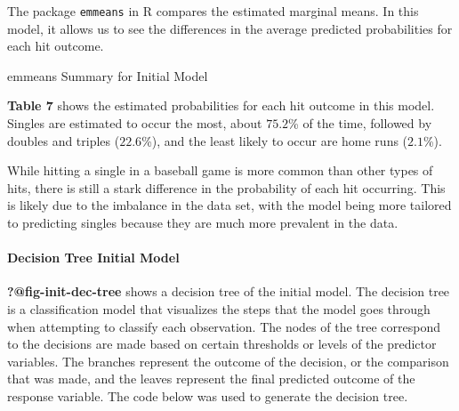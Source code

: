 \documentclass[
  letterpaper,
  DIV=11,
  numbers=noendperiod]{scrartcl}
\let\oldparagraph\paragraph
\renewcommand{\paragraph}[1]{\oldparagraph{#1}\mbox{}}
\begin{document}
\newpage

The package \texttt{emmeans} in R compares the estimated marginal means.
In this model, it allows us to see the differences in the average
predicted probabilities for each hit outcome.

\begin{table}

\caption{\label{tbl-7}emmeans Summary for Initial Model}


\end{table}%

\textbf{Table 7} shows the estimated probabilities for each hit outcome
in this model. Singles are estimated to occur the most, about \(75.2\)\%
of the time, followed by doubles and triples (\(22.6\)\%), and the least
likely to occur are home runs (\(2.1\)\%).

While hitting a single in a baseball game is more common than other
types of hits, there is still a stark difference in the probability of
each hit occurring. This is likely due to the imbalance in the data set,
with the model being more tailored to predicting singles because they
are much more prevalent in the data.

\paragraph{Decision Tree Initial
Model}\label{decision-tree-initial-model}

\textbf{?@fig-init-dec-tree} shows a decision tree of the initial model.
The decision tree is a classification model that visualizes the steps
that the model goes through when attempting to classify each
observation. The nodes of the tree correspond to the decisions are made
based on certain thresholds or levels of the predictor variables. The
branches represent the outcome of the decision, or the comparison that
was made, and the leaves represent the final predicted outcome of the
response variable. The code below was used to generate the decision
tree.
\end{document}
